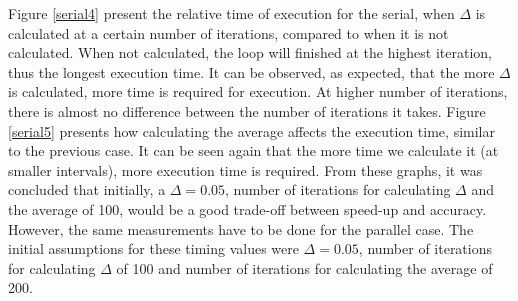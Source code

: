 \documentclass[11pt]{article}
\begin{document}
	Figure \ref{serial4} present the relative time of execution for the serial, when $\Delta$ is calculated at a certain number of iterations, compared to when it is not calculated. When not calculated, the loop will finished at the highest iteration, thus the longest execution time. It can be observed, as expected, that the more $\Delta$ is calculated, more time is required for execution. At higher number of iterations, there is almost no difference between the number of iterations it takes. Figure \ref{serial5} presents how calculating the average affects the execution time, similar to the previous case. It can be seen again that the more time we calculate it (at smaller intervals), more execution time is required. From these graphs, it was concluded that initially, a $\Delta=0.05$, number of iterations for calculating $\Delta$ and the average of 100, would be a good trade-off between speed-up and accuracy. However, the same measurements have to be done for the parallel case. The initial assumptions for these timing values were $\Delta=0.05$, number of iterations for calculating $\Delta$ of 100 and number of iterations for calculating the average of 200. 
	
\end{document}
